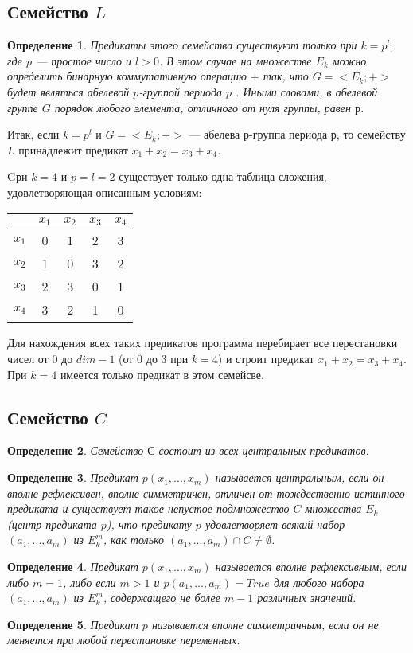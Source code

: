 \documentclass[a4paper,14pt]{extreport}
\newtheorem{opr}{Определение}
\begin{document}
\subsection{Семейство $L$}
\begin{opr}
Предикаты этого семейства существуют только при $k = p^l$, где $p$ — простое число и $l > 0$. В этом случае на множестве $E_k$ можно определить бинарную коммутативную операцию $+$ так, 
что $G = <E_k;+>$ будет являться абелевой $p$-группой периода $p$ . Иными словами, в абелевой группе $G$ порядок любого элемента, отличного от нуля группы, равен $р$. 
\end{opr}
Итак, если $k = p^l$ и $G = <E_k; +>$ — абелева $р$-группа периода $р$, то семейству $L$ принадлежит предикат $x_1+x_2=x_3+x_4$. 

Gри $k=4$ и $p=l=2$ существует только одна таблица сложения, удовлетворяющая описанным условиям: 
\begin{center}
\begin{tabular}{|c|c|c|c|c|}
\hline
&$x_1$&$x_2$&$x_3$&$x_4$\\
\hline
$x_1$&0&1&2&3\\
\hline
$x_2$&1&0&3&2\\
\hline
$x_3$&2&3&0&1\\
\hline
$x_4$&3&2&1&0\\
\hline
\end{tabular}
\end{center}

Для нахождения всех таких предикатов программа перебирает все перестановки чисел от $0$ до $dim-1$ (от $0$ до $3$ при $k=4$) и строит предикат $x_1+x_2=x_3+x_4$. При $k=4$ имеется только предикат в этом семейсве.
\subsection{Семейство $C$}
\begin{opr}
Семейство $С$ состоит из всех центральных предикатов.
\end{opr}

\begin{opr} Предикат $p(x_1,...,x_m )$ называется центральным, если он вполне рефлексивен, вполне симметричен, отличен от тождественно истинного предиката и существует такое непустое подмножество $C$ множества $E_k$ (центр предиката $p$),  что предикату $p$ удовлетворяет всякий набор $(a_1,..., a_m)$ из $E_k^m$, как только $(a_1,..., a_m) \cap C \neq \emptyset$.
\end{opr}
\begin{opr}Предикат $p(x_1,..., x_m)$ называется вполне рефлексивным, если либо $m = 1$, либо  если $m > 1$ и $p(a_1,..., a_m) = True$ для любого набора $(a_1,...,a_m)$ из $E_k^m$, содержащего не более $m-1$ различных значений.
\end{opr}
\begin{opr} 
Предикат $p$ называется вполне симметричным, если он не меняется при любой перестановке переменных.  
\end{opr}
\end{document}
